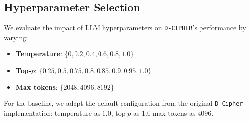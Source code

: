 


\subsection{Hyperparameter Selection}
We evaluate the impact of LLM hyperparameters on \texttt{D-CIPHER}'s performance by varying:

\begin{itemize}
    \item \textbf{Temperature}: $\{0, 0.2, 0.4, 0.6, 0.8, 1.0\}$
    \item \textbf{Top-$p$}: $\{0.25, 0.5, 0.75, 0.8, 0.85, 0.9, 0.95, 1.0\}$
    \item \textbf{Max tokens}: $\{2048, 4096, 8192\}$
\end{itemize}

For the baseline, we adopt the default configuration from the original \texttt{D-Cipher} implementation:
temperature as $1.0$, top-$p$ as 1.0 max tokens as $4096$.%

